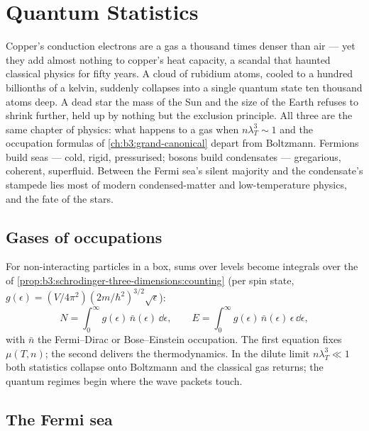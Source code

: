 \chapter{Quantum Statistics}\label{ch:b3:quantum-statistics}

Copper's conduction electrons are a gas a thousand times denser than
air --- yet they add almost nothing to copper's heat capacity, a
scandal that haunted classical physics for fifty years. A cloud of
rubidium atoms, cooled to a hundred billionths of a kelvin,
suddenly collapses into a single quantum state ten thousand atoms
deep. A dead star the mass of the Sun and the size of the Earth
refuses to shrink further, held up by nothing but the exclusion
principle. All three are the same chapter of physics: what happens
to a gas when $n\lambda_T^3 \sim 1$ and the occupation formulas of
\cref{ch:b3:grand-canonical} depart from Boltzmann. Fermions build
seas --- cold, rigid, pressurised; bosons build condensates ---
gregarious, coherent, superfluid. Between the Fermi sea's silent
majority and the condensate's stampede lies most of modern
condensed-matter and low-temperature physics, and the fate of the
stars.

\section{Gases of occupations}

\begin{proposition}\label{prop:b3:quantum-statistics:machinery}
For non-interacting particles in a box, sums over levels become
integrals over the  of
\cref{prop:b3:schrodinger-three-dimensions:counting} (per spin
state, $g(\epsilon) = (V/4\pi^2)(2m/\hbar^2)^{3/2}\sqrt\epsilon$):
\[
N = \int_0^\infty g(\epsilon)\,\bar n(\epsilon)\,\dd\epsilon ,
\qquad
E = \int_0^\infty g(\epsilon)\,\bar n(\epsilon)\,\epsilon\,
\dd\epsilon ,
\]
with $\bar n$ the Fermi--Dirac or Bose--Einstein occupation. The
first equation fixes $\mu(T, n)$; the second delivers the
thermodynamics. In the dilute limit $n\lambda_T^3 \ll 1$ both
statistics collapse onto Boltzmann and the classical gas returns;
the quantum regimes begin where the wave packets touch.
\end{proposition}
\admitted

\section{The Fermi sea}

